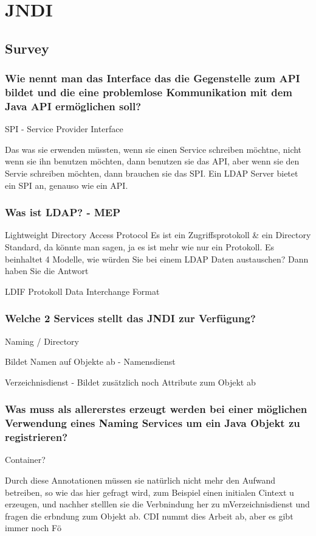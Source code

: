 \chapter{JNDI}


\section{Survey}

\subsection{Wie nennt man das Interface das die Gegenstelle zum API bildet und die eine problemlose Kommunikation mit dem Java API ermöglichen soll?}
SPI - Service Provider Interface

Das was sie erwenden müssten, wenn sie einen Service schreiben möchtne, nicht wenn sie ihn benutzen möchten, dann benutzen sie das API, aber wenn sie den Servie schreiben möchten, dann brauchen sie das SPI. Ein LDAP Server bietet ein SPI an, genauso wie ein API.

\subsection{Was ist LDAP? - MEP}
Lightweight Directory Access Protocol
Es ist ein Zugriffsprotokoll \& ein Directory Standard, da könnte man sagen, ja es ist mehr wie nur ein Protokoll. Es beinhaltet 4 Modelle, wie würden Sie bei einem LDAP Daten austauschen? Dann haben Sie die Antwort 

LDIF Protokoll
Data Interchange Format


\subsection{Welche 2 Services stellt das JNDI zur Verfügung?}
Naming / Directory

Bildet Namen auf Objekte ab - Namensdienst

Verzeichnisdienst - Bildet zusätzlich noch Attribute zum Objekt ab


\subsection{Was muss als allererstes erzeugt werden bei einer möglichen Verwendung eines Naming Services um ein Java Objekt zu registrieren?}
Container?

Durch diese Annotationen müssen sie natürlich nicht mehr den Aufwand betreiben, so wie das hier gefragt wird, zum Beispiel einen initialen Cintext u erzeugen, und nachher stelllen sie die Verbnindung her zu mVerzeichnisdienst und fragen die erbndung zum Objekt ab. CDI nummt dies Arbeit ab, aber es gibt immer noch Fö

